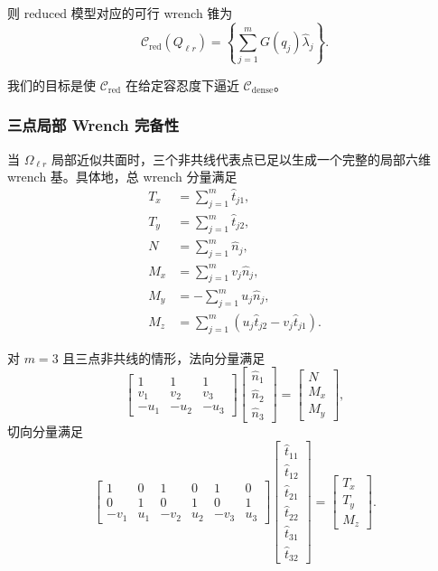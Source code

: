 则 reduced 模型对应的可行 wrench 锥为
\begin{equation}
\mathcal{C}_{\mathrm{red}}(Q_{\ell r})
=
\left\{
\sum_{j=1}^{m} G(q_j)\hat{\lambda}_j
\right\}.
\end{equation}

我们的目标是使 $\mathcal{C}_{\mathrm{red}}$ 在给定容忍度下逼近 $\mathcal{C}_{\mathrm{dense}}$。

\subsubsection{三点局部 Wrench 完备性}

当 $\Omega_{\ell r}$ 局部近似共面时，三个非共线代表点已足以生成一个完整的局部六维 wrench 基。具体地，总 wrench 分量满足
\begin{equation}
\begin{aligned}
T_x &= \sum_{j=1}^{m} \hat{t}_{j1},\\
T_y &= \sum_{j=1}^{m} \hat{t}_{j2},\\
N   &= \sum_{j=1}^{m} \hat{n}_j,\\
M_x &= \sum_{j=1}^{m} v_j \hat{n}_j,\\
M_y &= -\sum_{j=1}^{m} u_j \hat{n}_j,\\
M_z &= \sum_{j=1}^{m}\left(u_j \hat{t}_{j2}-v_j \hat{t}_{j1}\right).
\end{aligned}
\end{equation}

对 $m=3$ 且三点非共线的情形，法向分量满足
\begin{equation}
\begin{bmatrix}
1 & 1 & 1\\
v_1 & v_2 & v_3\\
-u_1 & -u_2 & -u_3
\end{bmatrix}
\begin{bmatrix}
\hat{n}_1\\
\hat{n}_2\\
\hat{n}_3
\end{bmatrix}
=
\begin{bmatrix}
N\\
M_x\\
M_y
\end{bmatrix},
\end{equation}
切向分量满足
\begin{equation}
\begin{bmatrix}
1 & 0 & 1 & 0 & 1 & 0\\
0 & 1 & 0 & 1 & 0 & 1\\
-v_1 & u_1 & -v_2 & u_2 & -v_3 & u_3
\end{bmatrix}
\begin{bmatrix}
\hat{t}_{11}\\
\hat{t}_{12}\\
\hat{t}_{21}\\
\hat{t}_{22}\\
\hat{t}_{31}\\
\hat{t}_{32}
\end{bmatrix}
=
\begin{bmatrix}
T_x\\
T_y\\
M_z
\end{bmatrix}.
\end{equation}

